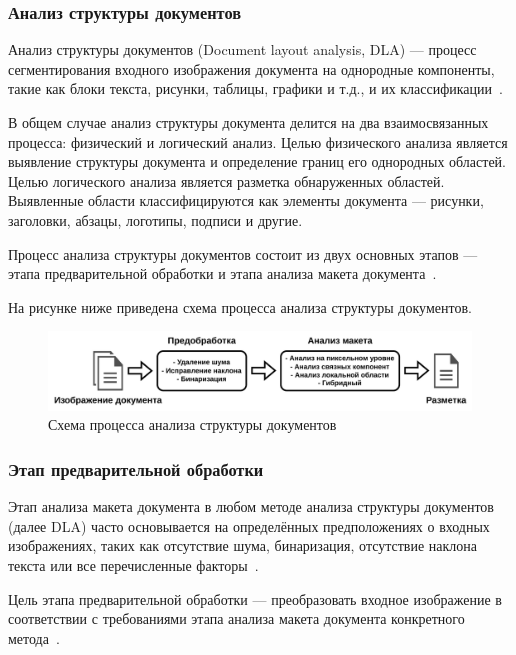 \subsubsection{Анализ структуры документов}

Анализ структуры документов (Document layout analysis, DLA) --- процесс сегментирования входного изображения документа на однородные компоненты, такие как блоки текста, рисунки, таблицы, графики и т.д., и их классификации~\cite{tnt}.

В общем случае анализ структуры документа делится на два взаимосвязанных процесса: физический и логический анализ.
Целью физического анализа является выявление структуры документа и определение границ его однородных областей.
Целью логического анализа является разметка обнаруженных областей. Выявленные области классифицируются как элементы документа --- рисунки, заголовки, абзацы, логотипы, подписи и другие.~\cite{dla-survey}

Процесс анализа структуры документов состоит из двух основных этапов --- этапа предварительной обработки и этапа анализа макета документа~\cite{dla-survey, dla-book}.

\newpage

На рисунке ниже приведена схема процесса анализа структуры документов.

\begin{figure}[H]
	\centering
	\includegraphics[width=\textwidth]{diag/dla.pdf}
	\caption{Схема процесса анализа структуры документов~\cite{dla-book}}
	\label{fig:}
\end{figure}

\subsubsection*{Этап предварительной обработки}

Этап анализа макета документа в любом методе анализа структуры документов (далее DLA) часто основывается на определённых предположениях о входных изображениях, таких как отсутствие шума, бинаризация, отсутствие наклона текста или все перечисленные факторы~\cite{dla-survey, dla-book}.

Цель этапа предварительной обработки --- преобразовать входное изображение в соответствии с требованиями этапа анализа макета документа конкретного метода~\cite{dla-survey, dla-book}.

